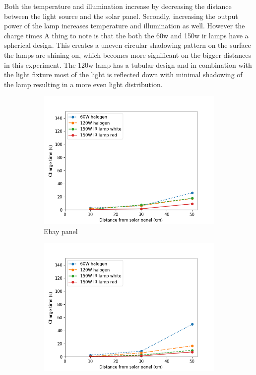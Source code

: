 Both the temperature and illumination increase by decreasing the distance between the light source and the solar panel. 
Secondly, increasing the output power of the lamp increases temperature and illumination as well. 
However the charge times 
A thing to note is that the both the 60w and 150w ir lamps have a spherical design. This creates a uneven circular shadowing pattern on the surface the lamps are shining on, which becomes more significant on the bigger distances in this experiment.
The 120w lamp has a tubular design and in combination with the light fixture most of the light is reflected down with minimal shadowing of the lamp resulting in a more even light distribution.

\begin{figure}
	\centering
	\begin{subfigure}[b]{0.49\textwidth}
		\includegraphics[width=\textwidth]{pics/light_experiment_figure1.png}
		\caption{Ebay panel}
		\label{fig:light_exp1}
	\end{subfigure}
	\begin{subfigure}[b]{0.49\textwidth}
		\includegraphics[width=\textwidth]{pics/light_experiment_figure2.png}

\end{subfigure}
\end{figure}
